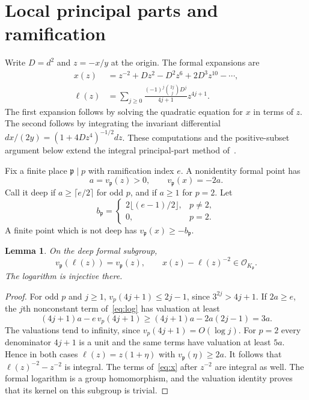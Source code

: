 \documentclass[11pt,a4paper]{article}
\newtheorem{lemma}[theorem]{Lemma}
\begin{document}
\section{Local principal parts and ramification}

Write $D=d^2$ and $z=-x/y$ at the origin. The formal
expansions are
\begin{align}
 x(z)&=z^{-2}+Dz^2-D^2z^6+2D^3z^{10}-\cdots,\label{eq:x}\\
 \ell(z)&=\sum_{j\ge0}
 \frac{(-1)^j\binom{2j}{j}D^j}{4j+1}z^{4j+1}.
 \label{eq:log}
\end{align}
The first expansion follows by solving the quadratic equation for
$x$ in terms of $z$. The second follows by integrating the invariant
differential
$dx/(2y)=(1+4Dz^4)^{-1/2}dz$.
These computations and the positive-subset argument below extend
the integral principal-part method of~\cite{Sums}.

Fix a finite place $\mathfrak p\mid p$ with ramification index $e$.
A nonidentity formal point has
\[
 a=v_\mathfrak p(z)>0,\qquad v_\mathfrak p(x)=-2a.
\]
Call it deep if $a\ge\lceil e/2\rceil$ for odd $p$, and if
$a\ge1$ for $p=2$.
Let
\[
 b_\mathfrak p=\begin{cases}2\lfloor(e-1)/2\rfloor,&p\ne2,\\0,&p=2.\end{cases}
\]
A finite point which is not deep has
$v_\mathfrak p(x)\ge-b_\mathfrak p$.

\begin{lemma}\label{lem:principal}
On the deep formal subgroup,
\[
 v_\mathfrak p(\ell(z))=v_\mathfrak p(z),\qquad
 x(z)-\ell(z)^{-2}\in\mathcal O_{K_\mathfrak p}.
\]
The logarithm is injective there.
\end{lemma}
\begin{proof}
For odd $p$ and $j\ge1$,
$v_p(4j+1)\le2j-1$, since $3^{2j}>4j+1$.
If $2a\ge e$, the $j$th nonconstant
term of~\eqref{eq:log} has valuation at least
\[
 (4j+1)a-e\,v_p(4j+1)\ge(4j+1)a-2a(2j-1)=3a.
\]
The valuations tend to infinity, since $v_p(4j+1)=O(\log j)$.
For $p=2$ every denominator $4j+1$ is a unit and the same terms
have valuation at least $5a$. Hence in both cases
$\ell(z)=z(1+\eta)$ with $v_\mathfrak p(\eta)\ge2a$.
It follows that $\ell(z)^{-2}-z^{-2}$ is integral.
The terms of~\eqref{eq:x} after $z^{-2}$ are integral as well.
The formal logarithm is a group homomorphism, and the valuation
identity proves that its kernel on this subgroup is trivial.
\end{proof}
\end{document}

